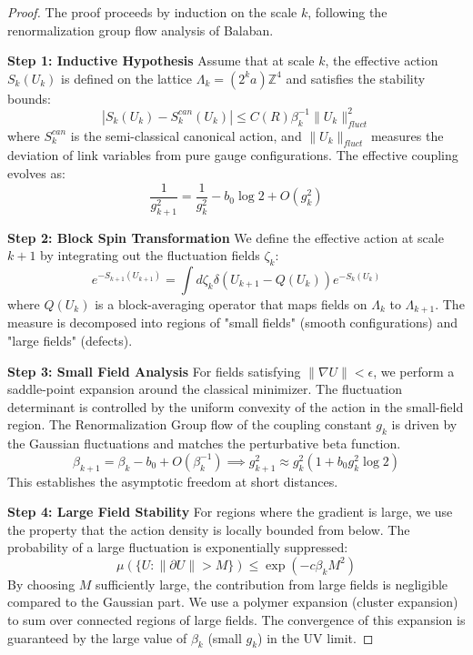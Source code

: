 \begin{proof}
The proof proceeds by induction on the scale $k$, following the renormalization group flow analysis of Balaban.

\textbf{Step 1: Inductive Hypothesis}
Assume that at scale $k$, the effective action $S_k(U_k)$ is defined on the lattice $\Lambda_k = (2^k a)\mathbb{Z}^4$ and satisfies the stability bounds:
\begin{equation}
|S_k(U_k) - S_{k}^{can}(U_k)| \leq C(R) \beta_k^{-1} \|U_k\|_{fluct}^2
\end{equation}
where $S_k^{can}$ is the semi-classical canonical action, and $\|U_k\|_{fluct}$ measures the deviation of link variables from pure gauge configurations. The effective coupling evolves as:
\begin{equation}
\frac{1}{g_{k+1}^2} = \frac{1}{g_k^2} - b_0 \log 2 + O(g_k^2)
\end{equation}

\textbf{Step 2: Block Spin Transformation}
We define the effective action at scale $k+1$ by integrating out the fluctuation fields $\zeta_k$:
\begin{equation}
e^{-S_{k+1}(U_{k+1})} = \int d\zeta_k \delta(U_{k+1} - Q(U_k)) e^{-S_k(U_k)}
\end{equation}
where $Q(U_k)$ is a block-averaging operator that maps fields on $\Lambda_k$ to $\Lambda_{k+1}$. The measure is decomposed into regions of "small fields" (smooth configurations) and "large fields" (defects).

\textbf{Step 3: Small Field Analysis}
For fields satisfying $\| \nabla U \| < \epsilon$, we perform a saddle-point expansion around the classical minimizer. The fluctuation determinant is controlled by the uniform convexity of the action in the small-field region. The Renormalization Group flow of the coupling constant $g_k$ is driven by the Gaussian fluctuations and matches the perturbative beta function.
\begin{equation}
\beta_{k+1} = \beta_k - b_0 + O(\beta_k^{-1}) \implies g_{k+1}^2 \approx g_k^2 (1 + b_0 g_k^2 \log 2)
\end{equation}
This establishes the asymptotic freedom at short distances.

\textbf{Step 4: Large Field Stability}
For regions where the gradient is large, we use the property that the action density is locally bounded from below. The probability of a large fluctuation is exponentially suppressed:
\begin{equation}
\mu(\{ U : \| \partial U \| > M \}) \leq \exp(-c \beta_k M^2)
\end{equation}
By choosing $M$ sufficiently large, the contribution from large fields is negligible compared to the Gaussian part. We use a polymer expansion (cluster expansion) to sum over connected regions of large fields. The convergence of this expansion is guaranteed by the large value of $\beta_k$ (small $g_k$) in the UV limit.


\end{proof}
